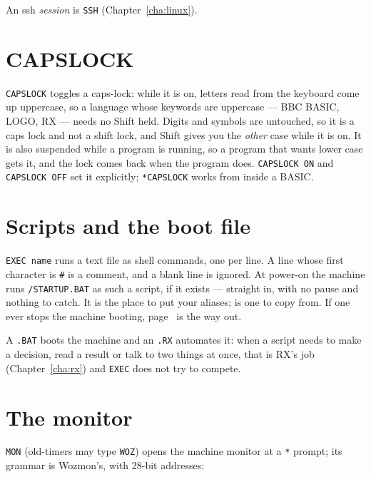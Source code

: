 \noindent An ssh \emph{session} is \verb|SSH| (Chapter~\ref{cha:linux}).

\section{CAPSLOCK}
\verb|CAPSLOCK| toggles a caps-lock: while it is on, letters read from the
keyboard come up uppercase, so a language whose keywords are uppercase ---
BBC BASIC, LOGO, RX --- needs no Shift held. Digits and symbols are
untouched, so it is a caps lock and not a shift lock, and Shift gives you
the \emph{other} case while it is on. It is also suspended while a
program is running, so a program that wants lower case gets it, and the
lock comes back when the program does. \verb|CAPSLOCK ON| and
\verb|CAPSLOCK OFF| set it explicitly; \verb|*CAPSLOCK| works from inside
a BASIC.

\section{Scripts and the boot file}
\verb|EXEC name| runs a text file as shell commands, one per line. A line
whose first character is \verb|#| is a comment, and a blank line is
ignored. At power-on the machine runs \verb|/STARTUP.BAT| as such a
script, if it exists --- straight in, with no pause and nothing to
catch. It is the place to put your aliases;
 is one to copy from. If one ever stops
the machine booting, page~\pageref{sec:badstartup} is the way out.

A \texttt{.BAT} boots the machine and an \texttt{.RX} automates it: when
a script needs to make a decision, read a result or talk to two things
at once, that is RX's job (Chapter~\ref{cha:rx}) and \verb|EXEC| does
not try to compete.

\section{The monitor}
\verb|MON| (old-timers may type \verb|WOZ|) opens the machine monitor at a
\verb|*| prompt; its grammar is Wozmon's, with 28-bit addresses:



